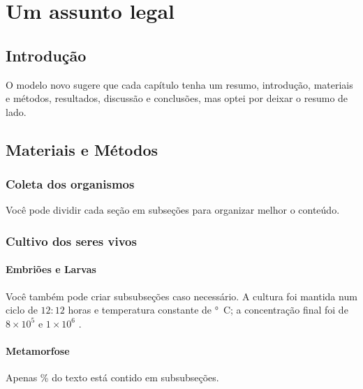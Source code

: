 \chapter{Um assunto legal}\label{cap2}

\section{Introdução}\label{cap2:intro}

O modelo novo sugere que cada capítulo tenha um resumo, introdução, materiais e métodos, resultados, discussão e conclusões, mas optei por deixar o resumo de lado.

\section{Materiais e Métodos}\label{cap2:mem}

\subsection{Coleta dos organismos}\label{cap2:mem:coleta}

Você pode dividir cada seção em subseções para organizar melhor o conteúdo.

\subsection{Cultivo dos seres vivos}\label{cap2:mem:gametas}

\subsubsection{Embriões e Larvas}

Você também pode criar subsubseções caso necessário.
A cultura foi mantida num ciclo de $12:12$ horas e temperatura constante de \unit[24]{°C}; a concentração final foi de $8\times10^5$ e $1\times10^6$ .

\subsubsection{Metamorfose}

Apenas \unit[4]{\%} do texto está contido em subsubseções.

